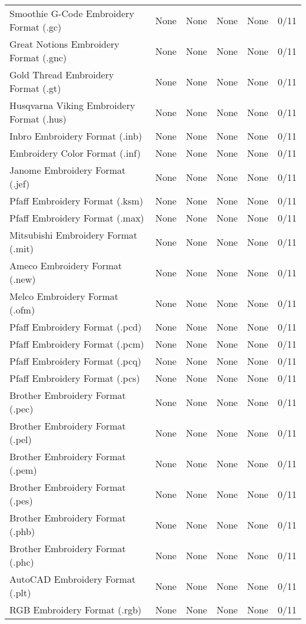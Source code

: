 \begin{longtable}{p{5cm} p{1.5cm} p{1.5cm} p{1.5cm} l l}
Smoothie G-Code Embroidery Format (.gc) & None & None & None & None & 0/11 \\
Great Notions Embroidery Format (.gnc) & None & None & None & None & 0/11 \\
Gold Thread Embroidery Format (.gt) & None & None & None & None & 0/11 \\
Husqvarna Viking Embroidery Format (.hus) & None & None & None & None & 0/11 \\
Inbro Embroidery Format (.inb) & None & None & None & None & 0/11 \\
Embroidery Color Format (.inf) & None & None & None & None & 0/11 \\
Janome Embroidery Format (.jef) & None & None & None & None & 0/11 \\
Pfaff Embroidery Format (.ksm) & None & None & None & None & 0/11 \\
Pfaff Embroidery Format (.max) & None & None & None & None & 0/11 \\
Mitsubishi Embroidery Format (.mit) & None & None & None & None & 0/11 \\
Ameco Embroidery Format (.new) & None & None & None & None & 0/11 \\
Melco Embroidery Format (.ofm) & None & None & None & None & 0/11 \\
Pfaff Embroidery Format (.pcd) &  None & None & None & None & 0/11 \\
Pfaff Embroidery Format (.pcm) & None & None & None & None & 0/11 \\
Pfaff Embroidery Format (.pcq) & None & None & None & None & 0/11 \\
Pfaff Embroidery Format (.pcs) & None & None & None & None & 0/11 \\
Brother Embroidery Format (.pec) & None & None & None & None & 0/11 \\
Brother Embroidery Format (.pel) & None & None & None & None & 0/11 \\
Brother Embroidery Format (.pem) & None & None & None & None & 0/11 \\
Brother Embroidery Format (.pes) & None & None & None & None & 0/11 \\
Brother Embroidery Format (.phb) & None & None & None & None & 0/11 \\
Brother Embroidery Format (.phc) & None & None & None & None & 0/11 \\
AutoCAD Embroidery Format (.plt) & None & None & None & None & 0/11 \\
RGB Embroidery Format (.rgb) & None & None & None & None & 0/11 \\

\end{longtable}
